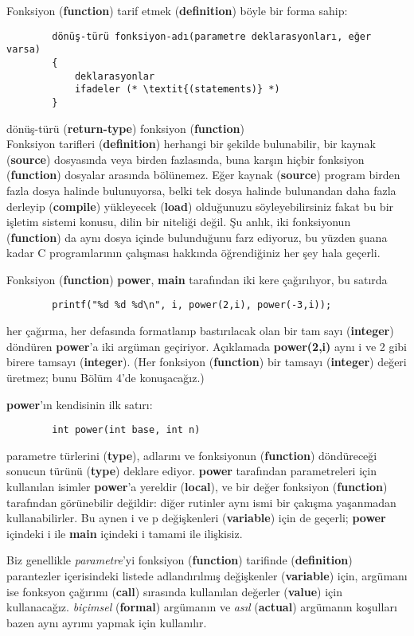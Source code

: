 \documentclass[a4paper,12pt,oneside]{book}
\begin{document}
Fonksiyon (\textbf{function}) tarif etmek (\textbf{definition}) böyle bir forma sahip:
\begin{lstlisting}
		dönüş-türü fonksiyon-adı(parametre deklarasyonları, eğer varsa)
		{
			deklarasyonlar
			ifadeler (* \textit{(statements)} *)
		}
\end{lstlisting}
dönüş-türü (\textbf{return-type}) fonksiyon (\textbf{function}) \pagebreak \\
\noindent Fonksiyon tarifleri (\textbf{definition}) herhangi bir şekilde bulunabilir, bir kaynak (\textbf{source}) dosyasında veya birden fazlasında, buna karşın hiçbir fonksiyon (\textbf{function}) dosyalar arasında bölünemez. Eğer kaynak (\textbf{source}) program birden fazla dosya halinde bulunuyorsa, belki tek dosya halinde bulunandan daha fazla derleyip (\textbf{compile}) yükleyecek (\textbf{load}) olduğunuzu söyleyebilirsiniz fakat bu bir işletim sistemi konusu, dilin bir niteliği değil. Şu anlık, iki fonksiyonun (\textbf{function}) da aynı dosya içinde bulunduğunu farz ediyoruz, bu yüzden şuana kadar C programlarının çalışması hakkında öğrendiğiniz her şey hala geçerli.
\par Fonksiyon (\textbf{function}) \textbf{power}, \textbf{main} tarafından iki kere çağırılıyor, bu satırda
\begin{lstlisting}
		printf("%d %d %d\n", i, power(2,i), power(-3,i));
\end{lstlisting}
her çağırma, her defasında formatlanıp bastırılacak olan bir tam sayı (\textbf{integer}) döndüren \textbf{power}'a iki argüman geçiriyor. Açıklamada \textbf{power(2,i)} aynı i ve 2 gibi birere tamsayı (\textbf{integer}). (Her fonksiyon (\textbf{function}) bir tamsayı (\textbf{integer}) değeri üretmez; bunu Bölüm 4'de konuşacağız.)
\par \textbf{power}'ın kendisinin ilk satırı:
\begin{lstlisting}
		int power(int base, int n)
\end{lstlisting}
parametre türlerini (\textbf{type}), adlarını ve fonksiyonun (\textbf{function}) döndüreceği sonucun türünü (\textbf{type}) deklare ediyor. \textbf{power} tarafından parametreleri için kullanılan isimler \textbf{power}'a yereldir (\textbf{local}), ve bir değer fonksiyon (\textbf{function}) tarafından görünebilir değildir: diğer rutinler aynı ismi bir çakışma yaşanmadan kullanabilirler. Bu aynen i ve p değişkenleri (\textbf{variable}) için de geçerli; \textbf{power} içindeki i ile \textbf{main} içindeki i tamami ile ilişkisiz.
\par Biz genellikle \textit{parametre}'yi fonksiyon (\textbf{function}) tarifinde (\textbf{definition}) parantezler içerisindeki listede adlandırılmış değişkenler (\textbf{variable}) için, argümanı ise fonksyon çağırımı (\textbf{call}) sırasında kullanılan değerler (\textbf{value}) için kullanacağız. \textit{biçimsel} (\textbf{formal}) argümanın ve \textit{asıl} (\textbf{actual}) argümanın koşulları bazen aynı ayrımı yapmak için kullanılır.
\end{document}
